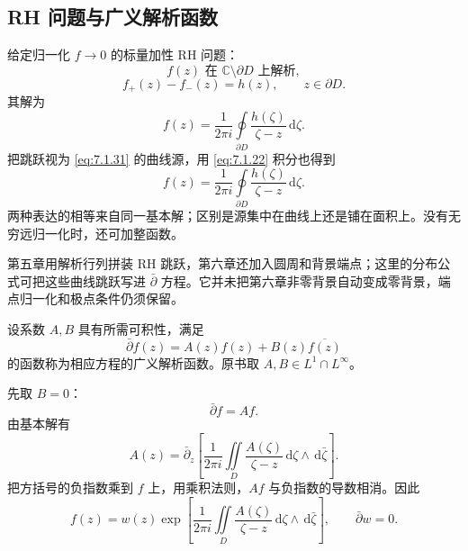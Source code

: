 \documentclass[lang=cn,scheme=chinese,mode=simple,device=normal,color=blue,math=cm,thmcnt=section,12pt]{elegantbook}
\newcommand{\dd}{\,\mathrm{d}}
\newcommand{\eqq}[2]{\tag{#1}\label{eq:#1}#2}
\begin{document}
\subsection{RH 问题与广义解析函数}
给定归一化 $f\to0$ 的标量加性 RH 问题：
\begin{equation}
\eqq{7.1.33}{f(z)\text{ 在 }\mathbb C\setminus\partial D\text{ 上解析},}
\end{equation}
\begin{equation}
\eqq{7.1.34}{f_+(z)-f_-(z)=h(z),\qquad z\in\partial D.}
\end{equation}
其解为
\begin{equation}
\eqq{7.1.35}{f(z)=\dfrac{1}{2\pi i}\oint\limits_{\partial D}\dfrac{h(\zeta)}{\zeta-z}\dd\zeta.}
\end{equation}
把跳跃视为 \eqref{eq:7.1.31} 的曲线源，用 \eqref{eq:7.1.22} 积分也得到
\begin{equation}
\eqq{7.1.36}{f(z)=\dfrac{1}{2\pi i}\oint\limits_{\partial D}\dfrac{h(\zeta)}{\zeta-z}\dd\zeta.}
\end{equation}
两种表达的相等来自同一基本解；区别是源集中在曲线上还是铺在面积上。没有无穷远归一化时，还可加整函数。
\begin{remark}
第五章用解析行列拼装 RH 跳跃，第六章还加入圆周和背景端点；这里的分布公式可把这些曲线跳跃写进 $\bar\partial$ 方程。它并未把第六章非零背景自动变成零背景，端点归一化和极点条件仍须保留。
\end{remark}
\begin{definition}[广义解析函数]
设系数 $A,B$ 具有所需可积性，满足
\begin{equation}
\eqq{7.1.37}{\bar\partial f(z)=A(z)f(z)+B(z)\overline{f(z)}}
\end{equation}
的函数称为相应方程的广义解析函数。原书取 $A,B\in L^1\cap L^\infty$。
\end{definition}
先取 $B=0$：
\begin{equation}
\eqq{7.1.38}{\bar\partial f=Af.}
\end{equation}
由基本解有
\begin{equation}
\eqq{7.1.39}{A(z)=\bar\partial_z\left[\dfrac{1}{2\pi i}\iint\limits_D\dfrac{A(\zeta)}{\zeta-z}\dd\zeta\wedge\dd\bar\zeta\right].}
\end{equation}
把方括号的负指数乘到 $f$ 上，用乘积法则，$Af$ 与负指数的导数相消。因此
\begin{equation}
\eqq{7.1.40}{f(z)=w(z)\exp\left[\dfrac{1}{2\pi i}\iint\limits_D\dfrac{A(\zeta)}{\zeta-z}\dd\zeta\wedge\dd\bar\zeta\right],\qquad \bar\partial w=0.}
\end{equation}
\end{document}
